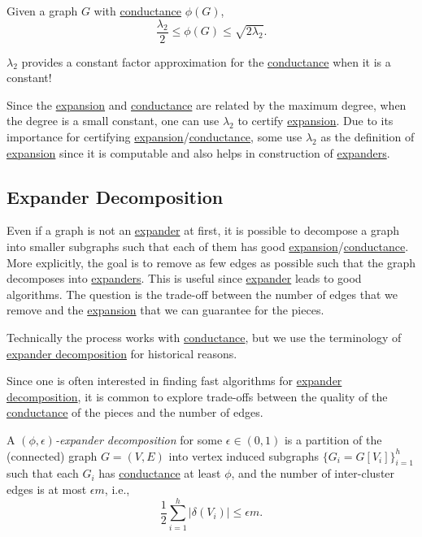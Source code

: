 \begin{theorem}\label{def:Chegger-inequality}
	Given a graph \(G\) with \hyperref[def:conductance]{conductance} \(\phi (G)\),
	\[
		\frac{\lambda _2}{2}
		\leq \phi (G)
		\leq \sqrt{2 \lambda _2}.
	\]
\end{theorem}

\begin{remark}
	\(\lambda _2\) provides a constant factor approximation for the \hyperref[def:conductance]{conductance} when it is a constant!
\end{remark}

Since the \hyperref[def:expansion]{expansion} and \hyperref[def:conductance]{conductance} are related by the maximum degree, when the degree is a small constant, one can use \(\lambda _2\) to certify \hyperref[def:expansion]{expansion}. Due to its importance for certifying \hyperref[def:expansion]{expansion}/\hyperref[def:conductance]{conductance}, some use \(\lambda _2\) as the definition of \hyperref[def:expansion]{expansion} since it is computable and also helps in construction of \hyperref[def:expander]{expanders}.

\subsection{Expander Decomposition}
Even if a graph is not an \hyperref[def:expander]{expander} at first, it is possible to decompose a graph into smaller subgraphs such that each of them has good \hyperref[def:expansion]{expansion}/\hyperref[def:conductance]{conductance}. More explicitly, the goal is to remove as few edges as possible such that the graph decomposes into \hyperref[def:expander]{expanders}. This is useful since \hyperref[def:expander]{expander} leads to good algorithms. The question is the trade-off between the number of edges that we remove and the \hyperref[def:expansion]{expansion} that we can guarantee for the pieces.

\begin{notation}
	Technically the process works with \hyperref[def:conductance]{conductance}, but we use the terminology of \hyperref[def:expander-decomposition]{expander decomposition} for historical reasons.
\end{notation}

Since one is often interested in finding fast algorithms for \hyperref[def:expander-decomposition]{expander decomposition}, it is common to explore trade-offs between the quality of the \hyperref[def:conductance]{conductance} of the pieces and the number of edges.

\begin{definition}\label{def:expander-decomposition}
	A \emph{\((\phi, \epsilon )\)-expander decomposition} for some \(\epsilon \in (0, 1)\) is a partition of the (connected) graph \(G = (V, E)\) into vertex induced subgraphs \(\{ G_i = G[V_i] \}_{i=1}^{h} \) such that each \(G_i\) has \hyperref[def:conductance]{conductance} at least \(\phi \), and the number of inter-cluster edges is at most \(\epsilon m\), i.e.,
	\[
		\frac{1}{2} \sum_{i=1}^{h} \lvert \delta (V_i) \rvert
		\leq \epsilon m.
	\]
\end{definition}